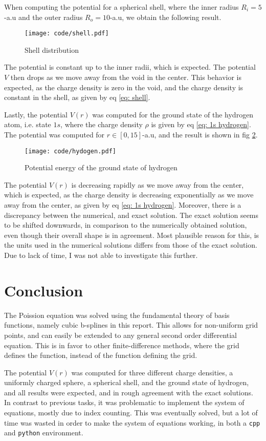 \documentclass[a4paper]{article}
\newcommand{\newparagraph}{\vspace{.5cm}\noindent}
\begin{document}
\newparagraph
When computing the potential for a spherical shell, where the inner radius $R_i = 5$-a.u and the outer radius $R_o = 10$-a.u, we obtain the following result.
\begin{figure}[H]
    \centering
    \texttt{[image: code/shell.pdf]}
    \caption{Shell distribution}
    \label{fig: shell distribution}
\end{figure}\noindent
The potential is constant up to the inner radii, which is expected. The potential $V$ then drops as we move away from the void in the center. This behavior is expected, as the charge density is zero in the void, and the charge density is constant in the shell, as given by eq \eqref{eq: shell}.

\newparagraph
Lastly, the potential $V(r)$ was computed for the ground state of the hydrogen atom, i.e. state $1s$, where the charge density $\rho$ is given by eq \eqref{eq: 1s hydrogen}.
The potential was computed for $r\in[0, 15]$-a.u, and the result is shown in fig \ref{fig: hydrogen potential}.
\begin{figure}[H]
    \centering
    \texttt{[image: code/hydogen.pdf]}
    \caption{Potential energy of the ground state of hydrogen}
    \label{fig: hydrogen potential}
\end{figure}\noindent
The potential $V(r)$ is decreasing rapidly as we move away from the center, which is expected, as the charge density is decreasing exponentially as we move away from the center, as given by eq \eqref{eq: 1s hydrogen}.
Moreover, there is a discrepancy between the numerical, and exact solution. The exact solution seems to be shifted downwards, in comparison to the numerically obtained solution, even though their overall shape is in agreement.
Most plausible reason for this, is the units used in the numerical solutions differs from those of the exact solution.
Due to lack of time, I was not able to investigate this further.


\section{Conclusion}
The Poission equation was solved using the fundamental theory of basis functions, namely cubic b-splines in this report.
This allows for non-uniform grid points, and can easily be extended to any general second order differential equation.
This is in favor to other finite-difference methods, where the grid defines the function, instead of the function defining the grid.

\newparagraph
The potential $V(r)$ was computed for three different charge densities, a uniformly charged sphere, a spherical shell, and the ground state of hydrogen, and all results were expected, and in rough agreement with the exact solutions.
In contrast to previous tasks, it was problematic to implement the system of equations, mostly due to index counting. This was eventually solved, but a lot of time was wasted in order to make the system of equations working, in both a \verb|cpp| and \verb|python| environment.

\end{document}
